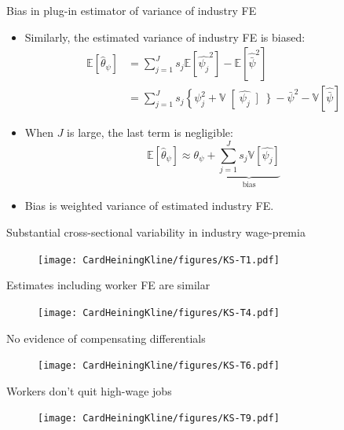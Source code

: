 \documentclass[notes=show]{beamer}
\begin{document}
\begin{frame}{Bias in plug-in estimator of variance of industry FE}
\begin{itemize}
    \item Similarly, the estimated variance of industry FE is biased:
    \begin{align*}
         \mathbb{E}  \left[ \hat{\theta}_{\psi} \right] & = \sum_{j=1}^{J} s_{j}  \mathbb{E}  \left[\hat{\psi_{j}}^2 \right] -  \mathbb{E}  \left[ \hat{\bar{\psi}}^2 \right] \\
         & = \sum_{j=1}^{J}s_{j} \left\{ \psi_{j}^{2} + \mathbb{V} \right[ \hat{\psi_{j}} \left] \right\} - \bar{\psi}^2 - \mathbb{V} \left[ \hat{\bar{\psi}}\right]
    \end{align*}
     \item When $J$ is large, the last term is negligible:
    \begin{equation*}
         \mathbb{E}  \left[ \hat{\theta}_{\psi} \right] \approx \theta_{\psi} + \underbrace{\sum_{j=1}^{J} s_{j} \mathbb{V} \left[ \hat{\psi_{j}} \right]}_{\text{bias}}
    \end{equation*}
    \item Bias is weighted variance of estimated industry FE.
\end{itemize}
\end{frame}

\begin{frame}{Substantial cross-sectional variability in industry wage-premia}
\begin{figure}[p!]
 \texttt{[image: CardHeiningKline/figures/KS-T1.pdf]} 
\end{figure}
\end{frame}

\begin{frame}{Estimates including worker FE are similar}
\begin{figure}[p!]
 \texttt{[image: CardHeiningKline/figures/KS-T4.pdf]} 
\end{figure}
\end{frame}

\begin{frame}{No evidence of compensating differentials}
\begin{figure}[p!]
 \texttt{[image: CardHeiningKline/figures/KS-T6.pdf]} 
\end{figure}
\end{frame}

\begin{frame}{Workers don't quit high-wage jobs}
\begin{figure}[p!]
 \texttt{[image: CardHeiningKline/figures/KS-T9.pdf]} 
\end{figure}
\end{frame}
\end{document}
